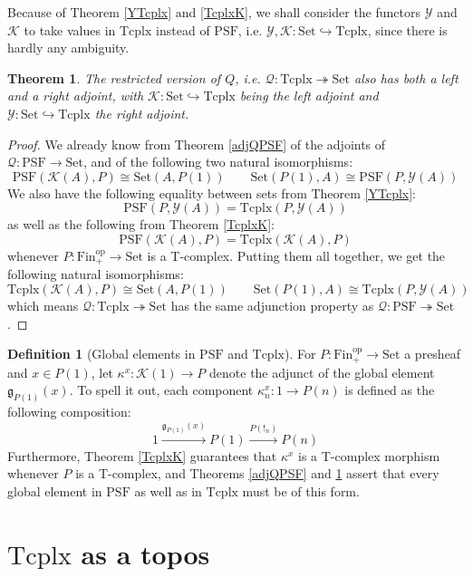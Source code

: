\documentclass{article}
\newtheorem{theorem}{Theorem}[subsection]
\theoremstyle{remark}
\theoremstyle{definition}
\newtheorem{definition}{Definition}[subsection]
\newcommand{\Fin}{\mathrm{Fin}}
\newcommand{\Set}{\mathrm{Set}}
\newcommand{\PSF}{\mathrm{PSF}}
\newcommand{\op}{\mathrm{op}}
\newcommand{\Y}{\mathcal Y}
\newcommand{\K}{\mathcal K}
\newcommand{\g}{\mathfrak g}
\newcommand{\Tcplx}{\mathrm{Tcplx}}
\newcommand{\Q}{\mathcal Q}
\begin{document}
	Because of Theorem \ref{YTcplx} and \ref{TcplxK}, we shall consider the functors $\Y$ and $\K$ to take values in $\Tcplx$ instead of $\PSF$, i.e. $\Y,\K:\Set\hookrightarrow\Tcplx$, since there is hardly any ambiguity.
	\begin{theorem}\label{adjQT}
		The restricted version of $Q$, i.e. $\Q:\Tcplx\twoheadrightarrow\Set$ also has both a left and a right adjoint, with $\K:\Set\hookrightarrow\Tcplx$ being the left adjoint and $\Y:\Set\hookrightarrow\Tcplx$ the right adjoint.
	\end{theorem}
	\begin{proof}
		We already know from Theorem \ref{adjQPSF} of the adjoints of $\Q:\PSF\to\Set$, and of the following two natural isomorphisms:
		\[\PSF(\K(A),P)\cong\Set(A,P(1))\qquad\Set(P(1),A)\cong\PSF(P,\Y(A))\]
		We also have the following equality between sets from Theorem \ref{YTcplx}:
		\[\PSF(P,\Y(A))=\Tcplx(P,\Y(A))\]
		as well as the following from Theorem \ref{TcplxK}:
		\[\PSF(\K(A),P)=\Tcplx(\K(A),P)\]
		whenever $P:\Fin_+^\op\to\Set$ is a T-complex. Putting them all together, we get the following natural isomorphisms:
		\[\Tcplx(\K(A),P)\cong\Set(A,P(1))\qquad\Set(P(1),A)\cong\Tcplx(P,\Y(A))\]
		which means $\Q:\Tcplx\twoheadrightarrow\Set$ has the same adjunction property as $\Q:\PSF\twoheadrightarrow\Set$.
	\end{proof}
	\begin{definition}[Global elements in $\PSF$ and $\Tcplx$]
		For $P:\Fin_+^\op\to\Set$ a presheaf and $x\in P(1)$, let $\kappa^x:\K(1)\to P$ denote the adjunct of the global element $\g_{P(1)}(x)$. To spell it out, each component $\kappa^x_n:1\to P(n)$ is defined as the following composition:
		\[1\xrightarrow{\g_{P(1)}(x)}P(1)\xrightarrow{P(!_n)}P(n)\]
		Furthermore, Theorem \ref{TcplxK} guarantees that $\kappa^x$ is a T-complex morphism whenever $P$ is a T-complex, and Theorems \ref{adjQPSF} and \ref{adjQT} assert that every global element in $\PSF$ as well as in $\Tcplx$ must be of this form.
	\end{definition}
	\section{$\Tcplx$ as a topos}
\end{document}
